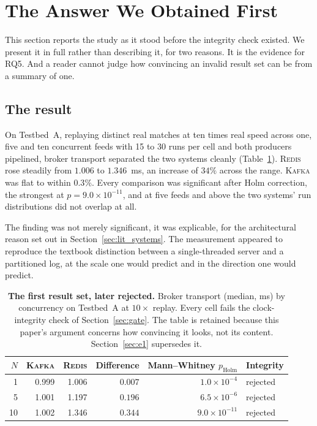 \documentclass[Afour,sageh,times]{sagej}
\newcommand{\redis}{\textsc{Redis}}
\newcommand{\kafka}{\textsc{Kafka}}
\begin{document}
\section{The Answer We Obtained First}
\label{sec:firstanswer}

This section reports the study as it stood before the integrity check existed. We present it in
full rather than describing it, for two reasons. It is the evidence for RQ5. And a reader cannot
judge how convincing an invalid result set can be from a summary of one.

\subsection{The result}
\label{sec:withdrawnresult}

On Testbed~A, replaying distinct real matches at ten times real speed across one, five and ten
concurrent feeds with 15 to 30 runs per cell and both producers pipelined, broker transport
separated the two systems cleanly (Table~\ref{tab:withdrawn}). \redis{} rose steadily from
$1.006$ to $1.346$~ms, an increase of $34\%$ across the range. \kafka{} was flat to within
$0.3\%$. Every comparison was significant after Holm correction, the strongest at
$p = 9.0\times10^{-11}$, and at five feeds and above the two systems' run distributions did not
overlap at all.

The finding was not merely significant, it was explicable, for the architectural reason set out in
Section~\ref{sec:lit_systems}. The measurement appeared to reproduce the textbook distinction
between a single-threaded server and a partitioned log, at the scale one would predict and in the
direction one would predict.

\begin{table}[htbp]
\centering
\caption{\textbf{The first result set, later rejected.} Broker transport (median, ms) by
concurrency on Testbed~A at $10\times$ replay. Every cell fails the clock-integrity check of
Section~\ref{sec:gate}. The table is retained because this paper's argument concerns how
convincing it looks, not its content. Section~\ref{sec:e1} supersedes it.}
\label{tab:withdrawn}
\begin{tabular}{rrrrrl}
\toprule
$N$ & \kafka{} & \redis{} & Difference & Mann--Whitney $p_{\text{Holm}}$ & Integrity \\
\midrule
1  & 0.999 & 1.006 & $0.007$ & $1.0\times10^{-4}$  & rejected \\
5  & 1.001 & 1.197 & $0.196$ & $6.5\times10^{-6}$  & rejected \\
10 & 1.002 & 1.346 & $0.344$ & $9.0\times10^{-11}$ & rejected \\
\bottomrule
\end{tabular}
\end{table}
\end{document}
